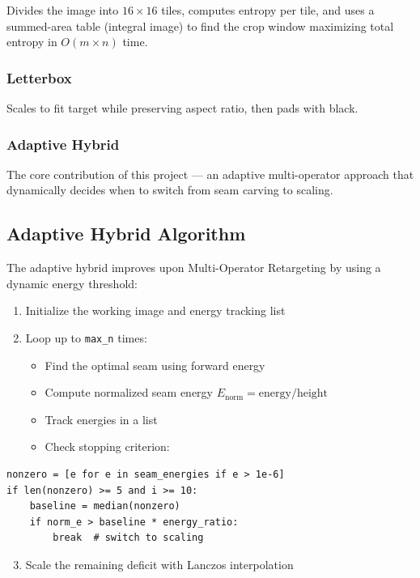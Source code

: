 \documentclass[12pt,a4paper]{article}
\begin{document}
Divides the image into $16\times 16$ tiles, computes entropy per tile, and uses a summed-area table (integral image) to find the crop window maximizing total entropy in $O(m \times n)$ time.

\subsubsection{Letterbox}

Scales to fit target while preserving aspect ratio, then pads with black.

\subsubsection{Adaptive Hybrid}

The core contribution of this project — an adaptive multi-operator approach that dynamically decides when to switch from seam carving to scaling.

\subsection{Adaptive Hybrid Algorithm}

The adaptive hybrid improves upon Multi-Operator Retargeting by using a dynamic energy threshold:

\begin{enumerate}
    \item Initialize the working image and energy tracking list
    \item Loop up to \texttt{max\_n} times:
    \begin{itemize}
        \item Find the optimal seam using forward energy
        \item Compute normalized seam energy $E_{\text{norm}} = \text{energy} / \text{height}$
        \item Track energies in a list
        \item Check stopping criterion:
    \end{itemize}
\end{enumerate}

\begin{lstlisting}
nonzero = [e for e in seam_energies if e > 1e-6]
if len(nonzero) >= 5 and i >= 10:
    baseline = median(nonzero)
    if norm_e > baseline * energy_ratio:
        break  # switch to scaling
\end{lstlisting}

\begin{enumerate}
    \setcounter{enumi}{2}
    \item Scale the remaining deficit with Lanczos interpolation
\end{enumerate}
\end{document}

